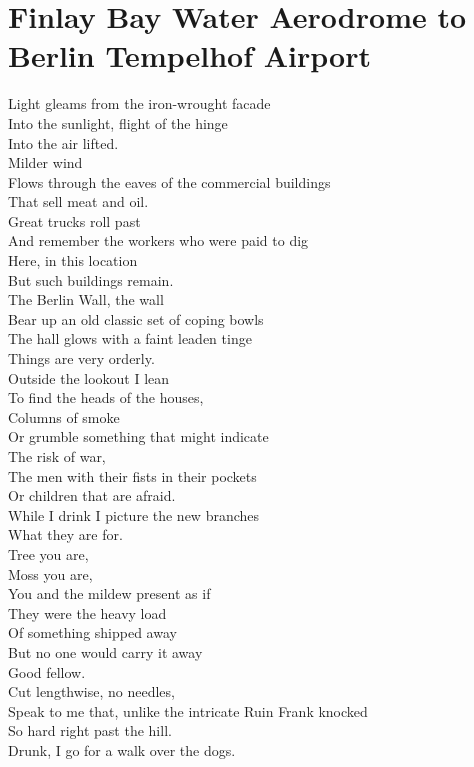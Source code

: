 \documentclass[smalldemyvopaper,11pt,twoside,onecolumn,openright,extrafontsizes]{memoir}
\begin{document}
\chapter{Finlay Bay Water Aerodrome to Berlin Tempelhof Airport}
Light gleams from the iron-wrought facade
\\Into the sunlight, flight of the hinge
\\Into the air lifted.
\\Milder wind
\\Flows through the eaves of the commercial buildings
\\That sell meat and oil.
\\Great trucks roll past
\\And remember the workers who were paid to dig
\\Here, in this location
\\But such buildings remain.
\\The Berlin Wall, the wall
\\Bear up an old classic set of coping bowls
\\The hall glows with a faint leaden tinge
\\Things are very orderly.
\\Outside the lookout I lean
\\To find the heads of the houses,
\\Columns of smoke
\\Or grumble something that might indicate
\\The risk of war,
\\The men with their fists in their pockets
\\Or children that are afraid.
\\While I drink I picture the new branches
\\What they are for.
\\Tree you are,
\\Moss you are,
\\You and the mildew present as if
\\They were the heavy load
\\Of something shipped away
\\But no one would carry it away
\\Good fellow.
\\Cut lengthwise, no needles,
\\Speak to me that, unlike the intricate Ruin Frank knocked
\\So hard right past the hill.
\\Drunk, I go for a walk over the dogs.
\end{document}

